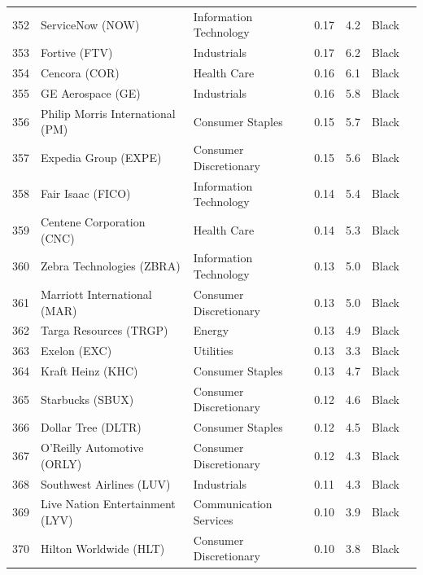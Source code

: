 \documentclass[11pt,a4paper]{article}
\begin{document}
{\begin{longtable}{r p{4.4cm} p{2.8cm} r r l l}
352 & ServiceNow (NOW) & Information Technology & 0.17 & 4.2 & \cellcolor[HTML]{BFBFBF}Black &  \\
353 & Fortive (FTV) & Industrials & 0.17 & 6.2 & \cellcolor[HTML]{BFBFBF}Black &  \\
354 & Cencora (COR) & Health Care & 0.16 & 6.1 & \cellcolor[HTML]{BFBFBF}Black &  \\
355 & GE Aerospace (GE) & Industrials & 0.16 & 5.8 & \cellcolor[HTML]{BFBFBF}Black &  \\
356 & Philip Morris International (PM) & Consumer Staples & 0.15 & 5.7 & \cellcolor[HTML]{BFBFBF}Black &  \\
357 & Expedia Group (EXPE) & Consumer Discretionary & 0.15 & 5.6 & \cellcolor[HTML]{BFBFBF}Black &  \\
358 & Fair Isaac (FICO) & Information Technology & 0.14 & 5.4 & \cellcolor[HTML]{BFBFBF}Black &  \\
359 & Centene Corporation (CNC) & Health Care & 0.14 & 5.3 & \cellcolor[HTML]{BFBFBF}Black &  \\
360 & Zebra Technologies (ZBRA) & Information Technology & 0.13 & 5.0 & \cellcolor[HTML]{BFBFBF}Black &  \\
361 & Marriott International (MAR) & Consumer Discretionary & 0.13 & 5.0 & \cellcolor[HTML]{BFBFBF}Black &  \\
362 & Targa Resources (TRGP) & Energy & 0.13 & 4.9 & \cellcolor[HTML]{BFBFBF}Black &  \\
363 & Exelon (EXC) & Utilities & 0.13 & 3.3 & \cellcolor[HTML]{BFBFBF}Black &  \\
364 & Kraft Heinz (KHC) & Consumer Staples & 0.13 & 4.7 & \cellcolor[HTML]{BFBFBF}Black &  \\
365 & Starbucks (SBUX) & Consumer Discretionary & 0.12 & 4.6 & \cellcolor[HTML]{BFBFBF}Black &  \\
366 & Dollar Tree (DLTR) & Consumer Staples & 0.12 & 4.5 & \cellcolor[HTML]{BFBFBF}Black &  \\
367 & O'Reilly Automotive (ORLY) & Consumer Discretionary & 0.12 & 4.3 & \cellcolor[HTML]{BFBFBF}Black &  \\
368 & Southwest Airlines (LUV) & Industrials & 0.11 & 4.3 & \cellcolor[HTML]{BFBFBF}Black &  \\
369 & Live Nation Entertainment (LYV) & Communication Services & 0.10 & 3.9 & \cellcolor[HTML]{BFBFBF}Black &  \\
370 & Hilton Worldwide (HLT) & Consumer Discretionary & 0.10 & 3.8 & \cellcolor[HTML]{BFBFBF}Black &  \\

\end{longtable}}
\end{document}
